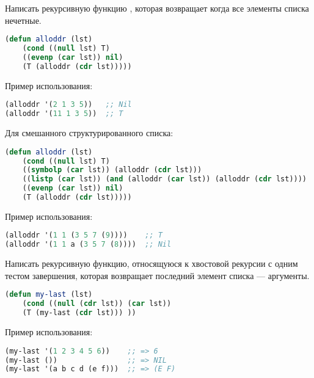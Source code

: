 \documentclass[a4paper,oneside,12pt]{extreport}
\begin{document}
\begin{task}
	Написать рекурсивную функцию , которая возвращает  когда все элементы списка нечетные.

    \begin{lstlisting}[language=Lisp]
(defun alloddr (lst)
    (cond ((null lst) T)
    ((evenp (car lst)) nil)
    (T (alloddr (cdr lst)))))    
    \end{lstlisting}

    Пример использования:
    \begin{lstlisting}[language=Lisp]
(alloddr '(2 1 3 5))   ;; Nil
(alloddr '(11 1 3 5))  ;; T
    \end{lstlisting}

    Для смешанного структурированного списка:
    \begin{lstlisting}[language=Lisp]
(defun alloddr (lst)
    (cond ((null lst) T)
    ((symbolp (car lst)) (alloddr (cdr lst)))
    ((listp (car lst)) (and (alloddr (car lst)) (alloddr (cdr lst))))
    ((evenp (car lst)) nil)
    (T (alloddr (cdr lst)))))    
    \end{lstlisting}

    Пример использования:
    \begin{lstlisting}[language=Lisp]
(alloddr '(1 1 (3 5 7 (9))))    ;; T
(alloddr '(1 1 a (3 5 7 (8))))  ;; Nil        
    \end{lstlisting}

\end{task}

\begin{task}
	Написать рекурсивную функцию, относящуюся к хвостовой рекурсии с одним тестом завершения,
    которая возвращает последний элемент списка — аргументы.

    \begin{lstlisting}[language=Lisp]
(defun my-last (lst)
    (cond ((null (cdr lst)) (car lst))
    (T (my-last (cdr lst))) ))
    \end{lstlisting}

    Пример использования:
    \begin{lstlisting}[language=Lisp] 
(my-last '(1 2 3 4 5 6))    ;; => 6
(my-last ())                ;; => NIL
(my-last '(a b c d (e f)))  ;; => (E F)
    \end{lstlisting}
\end{task}
\end{document}
